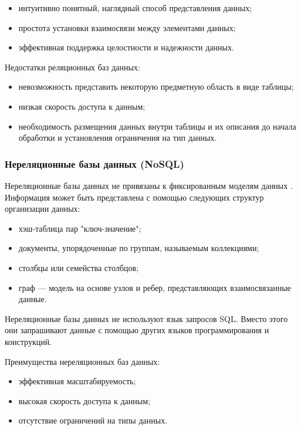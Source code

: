 \begin{itemize}
	\item интуитивно понятный, наглядный способ представления данных;
	\item простота установки взаимосвязи между элементами данных;
	\item эффективная поддержка целостности и надежности данных.
\end{itemize}

Недостатки реляционных баз данных:

\begin{itemize}
	\item невозможность представить некоторую предметную область в виде таблицы;
	\item низкая скорость доступа к данным;
	\item необходимость размещения данных внутри таблицы и их описания до начала обработки и установления ограничения на тип данных.
\end{itemize}

\subsubsection{Нереляционные базы данных (NoSQL)}

Нереляционные базы данных не привязаны к фиксированным моделям данных \cite{nosql}. Информация может быть представлена с помощью следующих структур организации данных:

\begin{itemize}
	\item хэш-таблица пар "ключ-значение";
	\item документы, упорядоченные по группам, называемым коллекциями;
	\item столбцы или семейства столбцов;
	\item граф --- модель на основе узлов и ребер, представляющих взаимосвязанные данные.
\end{itemize}

Нереляционные базы данных не используют язык запросов SQL. Вместо этого они запрашивают данные с помощью других языков программирования и конструкций.

Преимущества нереляционных баз данных:

\begin{itemize}
	\item эффективная масштабируемость;
	\item высокая скорость доступа к данным;
	\item отсутствие ограничений на типы данных.
\end{itemize}

